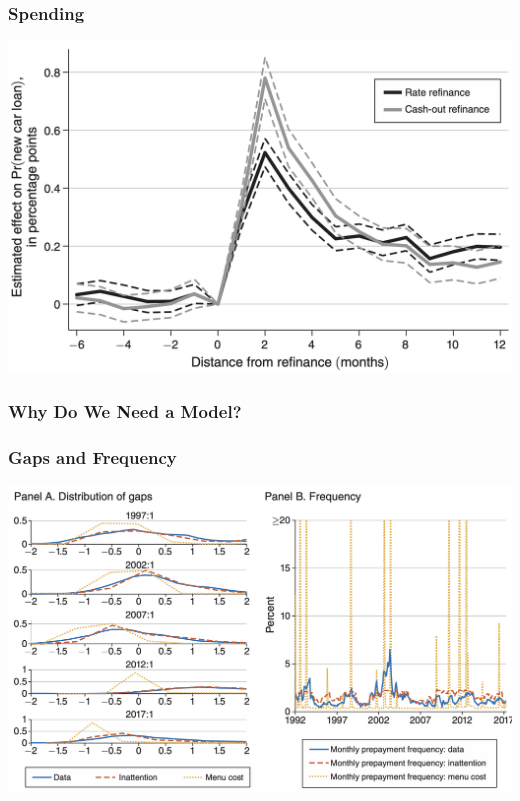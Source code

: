 \documentclass[english,xcolor=svgnames]{beamer}
\begin{document}
\begin{frame}
    \frametitle{Spending}
    \begin{center}
    	\includegraphics[scale=0.3]{figures/BMTVFIG5.png}	
    \end{center}
\end{frame}

\begin{frame}
    \frametitle{Why Do We Need a Model?}
\end{frame}

\begin{frame}
    \frametitle{Gaps and Frequency}
    \begin{center}
    	\includegraphics[scale=0.3]{figures/BMTVFIG9AB.png}	
    \end{center}
\end{frame}
\end{document}
